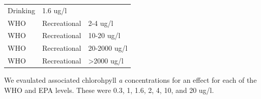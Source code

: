 \documentclass[11pt,]{article}
\begin{document}
\begin{longtable}[c]{@{}lll@{}}
\begin{minipage}[t]{0.16\columnwidth}
Drinking
\strut\end{minipage} &
\begin{minipage}[t]{0.19\columnwidth}\raggedright\strut
1.6 ug/l
\strut\end{minipage}\tabularnewline
\begin{minipage}[t]{0.11\columnwidth}\raggedright\strut
WHO
\strut\end{minipage} &
\begin{minipage}[t]{0.16\columnwidth}\raggedright\strut
Recreational
\strut\end{minipage} &
\begin{minipage}[t]{0.19\columnwidth}\raggedright\strut
2-4 ug/l
\strut\end{minipage}\tabularnewline
\begin{minipage}[t]{0.11\columnwidth}\raggedright\strut
WHO
\strut\end{minipage} &
\begin{minipage}[t]{0.16\columnwidth}\raggedright\strut
Recreational
\strut\end{minipage} &
\begin{minipage}[t]{0.19\columnwidth}\raggedright\strut
10-20 ug/l
\strut\end{minipage}\tabularnewline
\begin{minipage}[t]{0.11\columnwidth}\raggedright\strut
WHO
\strut\end{minipage} &
\begin{minipage}[t]{0.16\columnwidth}\raggedright\strut
Recreational
\strut\end{minipage} &
\begin{minipage}[t]{0.19\columnwidth}\raggedright\strut
20-2000 ug/l
\strut\end{minipage}\tabularnewline
\begin{minipage}[t]{0.11\columnwidth}\raggedright\strut
WHO
\strut\end{minipage} &
\begin{minipage}[t]{0.16\columnwidth}\raggedright\strut
Recreational
\strut\end{minipage} &
\begin{minipage}[t]{0.19\columnwidth}\raggedright\strut
\textgreater{}2000 ug/l
\strut\end{minipage}\tabularnewline
\bottomrule
\end{longtable}

We evaulated associated chlorohpyll \emph{a} concentrations for an
effect for each of the WHO and EPA levels. These were 0.3, 1, 1.6, 2, 4,
10, and 20 ug/l.
\end{document}
